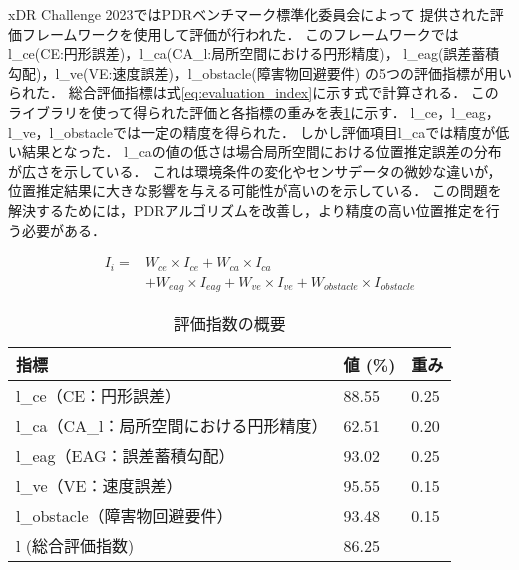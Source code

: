 xDR Challenge 2023ではPDRベンチマーク標準化委員会によって
提供された評価フレームワークを使用して評価が行われた．
このフレームワークではl\_ce(CE:円形誤差)，l\_ca(CA\_l:局所空間における円形精度)，
l\_eag(誤差蓄積勾配)，l\_ve(VE:速度誤差)，l\_obstacle(障害物回避要件)
の5つの評価指標が用いられた．
総合評価指標は式\ref{eq:evaluation_index}に示す式で計算される．
このライブラリを使って得られた評価と各指標の重みを表\ref{table:evaluation_index}に示す．
l\_ce，l\_eag， l\_ve，l\_obstacleでは一定の精度を得られた．
しかし評価項目l\_caでは精度が低い結果となった．
l\_caの値の低さは場合局所空間における位置推定誤差の分布が広さを示している．
これは環境条件の変化やセンサデータの微妙な違いが，位置推定結果に大きな影響を与える可能性が高いのを示している．
この問題を解決するためには，PDRアルゴリズムを改善し，より精度の高い位置推定を行う必要がある．

\begin{equation}
	\begin{aligned}
		I_i = & W_{ce} \times I_{ce} + W_{ca} \times I_{ca}                                        \\
		      & + W_{eag} \times I_{eag} + W_{ve} \times I_{ve} + W_{obstacle} \times I_{obstacle}
	\end{aligned}
	\label{eq:evaluation_index}
\end{equation}

\begin{table}[ht]
	\caption{評価指数の概要}
	\centering
	\begin{tabular}{l|l|l}
		\hline
		指標                        & 値 (\%) & 重み   \\ \hline
		l\_ce（CE：円形誤差）            & 88.55  & 0.25 \\
		l\_ca（CA\_l：局所空間における円形精度） & 62.51  & 0.20 \\
		l\_eag（EAG：誤差蓄積勾配）        & 93.02  & 0.25 \\
		l\_ve（VE：速度誤差）            & 95.55  & 0.15 \\
		l\_obstacle（障害物回避要件）      & 93.48  & 0.15 \\
		l (総合評価指数)                & 86.25  &      \\ \hline
	\end{tabular}
	\label{table:evaluation_index}
\end{table}



